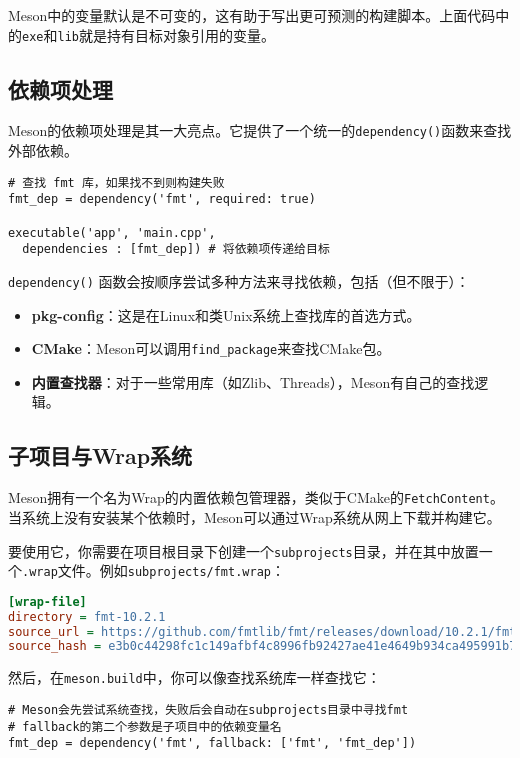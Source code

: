 \documentclass[../main.tex]{subfiles}
\begin{document}
Meson中的变量默认是不可变的，这有助于写出更可预测的构建脚本。上面代码中的\texttt{exe}和\texttt{lib}就是持有目标对象引用的变量。

\subsection{依赖项处理}
Meson的依赖项处理是其一大亮点。它提供了一个统一的\texttt{dependency()}函数来查找外部依赖。
\begin{lstlisting}
# 查找 fmt 库，如果找不到则构建失败
fmt_dep = dependency('fmt', required: true)

executable('app', 'main.cpp',
  dependencies : [fmt_dep]) # 将依赖项传递给目标
\end{lstlisting}

\texttt{dependency()} 函数会按顺序尝试多种方法来寻找依赖，包括（但不限于）：
\begin{itemize}
    \item \textbf{pkg-config}：这是在Linux和类Unix系统上查找库的首选方式。
    \item \textbf{CMake}：Meson可以调用\texttt{find\_package}来查找CMake包。
    \item \textbf{内置查找器}：对于一些常用库（如Zlib、Threads），Meson有自己的查找逻辑。
\end{itemize}

\subsection{子项目与Wrap系统}
Meson拥有一个名为Wrap的内置依赖包管理器，类似于CMake的\texttt{FetchContent}。当系统上没有安装某个依赖时，Meson可以通过Wrap系统从网上下载并构建它。

要使用它，你需要在项目根目录下创建一个\texttt{subprojects}目录，并在其中放置一个\texttt{.wrap}文件。例如\texttt{subprojects/fmt.wrap}：
\begin{lstlisting}[language=ini]
[wrap-file]
directory = fmt-10.2.1
source_url = https://github.com/fmtlib/fmt/releases/download/10.2.1/fmt-10.2.1.zip
source_hash = e3b0c44298fc1c149afbf4c8996fb92427ae41e4649b934ca495991b7852b855
\end{lstlisting}
然后，在\texttt{meson.build}中，你可以像查找系统库一样查找它：
\begin{lstlisting}
# Meson会先尝试系统查找，失败后会自动在subprojects目录中寻找fmt
# fallback的第二个参数是子项目中的依赖变量名
fmt_dep = dependency('fmt', fallback: ['fmt', 'fmt_dep'])
\end{lstlisting}
\end{document}
